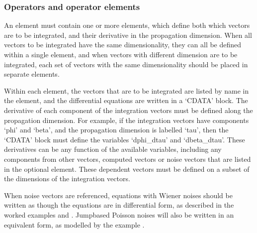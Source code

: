 \documentclass[letterpaper,10pt,english]{sphinxmanual}
\begin{document}
\subsubsection{Operators and operator elements}
\label{\detokenize{reference_elements:operators-and-operator-elements}}\label{\detokenize{reference_elements:operatorselement}}\label{\detokenize{reference_elements:index-70}}
\sphinxAtStartPar
An {\hyperref[\detokenize{reference_elements:integrateelement}]{}} element must contain one or more  elements, which define both which vectors are to be integrated, and their derivative in the propagation dimension.  When all vectors to be integrated have the same dimensionality, they can all be defined within a single  element, and when vectors with different dimension are to be integrated, each set of vectors with the same dimensionality should be placed in separate  elements.

\ignorespaces {}\label{\detokenize{reference_elements:integrationvectorselement}}
\sphinxAtStartPar
Within each  element, the vectors that are to be integrated are listed by name in the  element, and the differential equations are written in a ‘CDATA’ block.   The derivative of each component of the integration vectors must be defined along the propagation dimension.  For example, if the integration vectors have components ‘phi’ and ‘beta’, and the propagation dimension is labelled ‘tau’, then the ‘CDATA’ block must define the variables ‘dphi\_dtau’ and ‘dbeta\_dtau’.  These derivatives can be any function of the available variables, including any components from other vectors, computed vectors or noise vectors that are listed in the optional {\hyperref[\detokenize{reference_elements:dependencies}]{}} element.  These dependent vectors must be defined on a subset of the dimensions of the integration vectors.

\sphinxAtStartPar
When noise vectors are referenced, equations with Wiener noises should be written as though the equations are in differential form, as described in the worked examples {\hyperref[\detokenize{worked_examples:kubo}]{}} and {\hyperref[\detokenize{worked_examples:fibre}]{}}.  Jump\sphinxhyphen{}based Poisson noises will also be written in an equivalent form, as modelled by the example .
\end{document}
